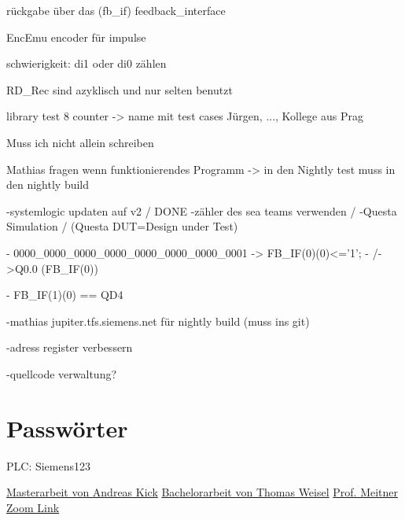 rückgabe über das (fb\_if) feedback\_interface

EncEmu encoder für impulse 

schwierigkeit: di1 oder di0 zählen

RD\_Rec sind azyklisch und nur selten benutzt

library test 8 counter -> name mit test cases Jürgen, ..., Kollege aus Prag

Muss ich nicht allein schreiben

Mathias fragen wenn funktionierendes Programm -> in den Nightly test muss in den nightly build

-systemlogic updaten auf v2 / DONE 
-zähler des sea teams verwenden /
-Questa Simulation /
(Questa DUT=Design under Test)

- 0000\_0000\_0000\_0000\_0000\_0000\_0000\_0001 -> FB\_IF(0)(0)<='1';
-    /->Q0.0                          (FB\_IF(0))

- FB\_IF(1)(0) == QD4

-mathias jupiter.tfs.siemens.net für nightly build (muss ins git)

-adress register verbessern

-quellcode verwaltung?
\chapter{Passwörter}

PLC: Siemens123

\href{https://siemens.sharepoint.com/teams/P0000045/Backbone/Abschlussarbeiten/Masterarbeit_Andreas_Kick.pdf}{Masterarbeit von Andreas Kick}
\href{https://siemens.sharepoint.com/teams/P0000045/Backbone/Abschlussarbeiten/Bachelorarbeit_Thomas_Weisel.pdf}{Bachelorarbeit von Thomas Weisel}
\href{https://th-nuernberg.zoom-x.de/j/2850045758}{Prof. Meitner Zoom Link}